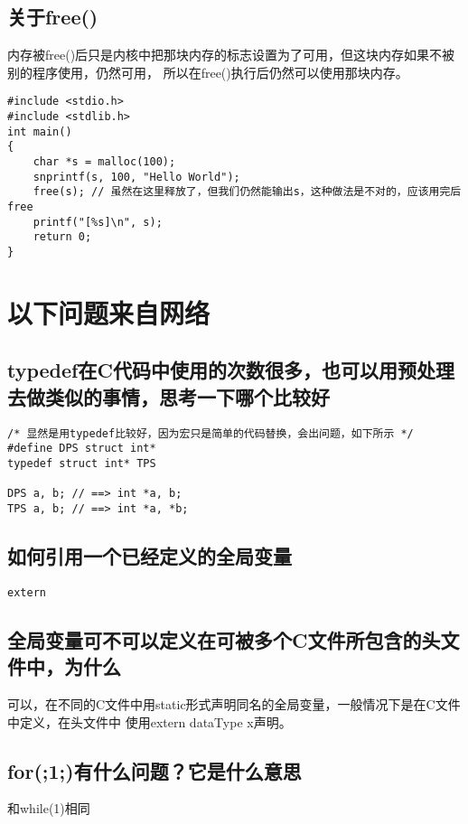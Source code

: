 \documentclass{article}
\begin{document}
\subsection{关于free()}
内存被free()后只是内核中把那块内存的标志设置为了可用，但这块内存如果不被别的程序使用，仍然可用，
所以在free()执行后仍然可以使用那块内存。


\begin{verbatim}
#include <stdio.h>
#include <stdlib.h>
int main()
{
	char *s = malloc(100);
	snprintf(s, 100, "Hello World");
	free(s); // 虽然在这里释放了，但我们仍然能输出s，这种做法是不对的，应该用完后free
	printf("[%s]\n", s);
	return 0;
}

\end{verbatim}
\section{以下问题来自网络}
\subsection{typedef在C代码中使用的次数很多，也可以用预处理去做类似的事情，思考一下哪个比较好}
\begin{verbatim}
/* 显然是用typedef比较好，因为宏只是简单的代码替换，会出问题，如下所示 */
#define DPS struct int*
typedef struct int* TPS

DPS a, b; // ==> int *a, b;
TPS a, b; // ==> int *a, *b;

\end{verbatim}

\subsection{如何引用一个已经定义的全局变量}
\begin{verbatim}
extern
\end{verbatim}


\subsection{全局变量可不可以定义在可被多个C文件所包含的头文件中，为什么}
可以，在不同的C文件中用static形式声明同名的全局变量，一般情况下是在C文件中定义，在头文件中
使用extern dataType x声明。

\subsection{for(;1;)有什么问题？它是什么意思}
和while(1)相同
\end{document}
